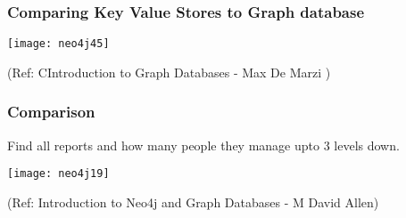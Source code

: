 \begin{frame}\frametitle{Comparing Key Value Stores to Graph database}

\begin{center}
\texttt{[image: neo4j45]}
\end{center}	  


{\tiny (Ref: CIntroduction to Graph Databases - Max De Marzi )}
\end{frame}













\begin{frame}[fragile]\frametitle{Comparison}
Find all reports and how many people they manage upto 3 levels down.

\begin{center}
\texttt{[image: neo4j19]}
\end{center}	    

{\tiny (Ref: Introduction to Neo4j and Graph Databases
 - M David Allen)}

\end{frame}

